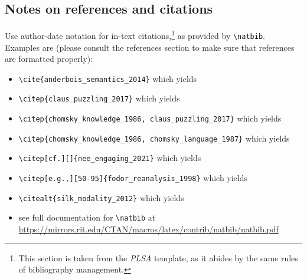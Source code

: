 \documentclass{article}
\begin{document}
\subsection{Notes on references and citations}  \label{ref}
Use author-date notation for in-text citations,\footnote{This section is taken from the \textit{PLSA} template, as it abides by the same rules of bibliography management.} as provided by \verb=\natbib=. Examples are (please consult the references section to make sure that references are formatted properly):
\begin{itemize}
    \item \verb=\cite{anderbois_semantics_2014}= which yields \cite{anderbois_semantics_2014}
    \item \verb=\citep{claus_puzzling_2017}= which yields \citep{claus_puzzling_2017}
    \item \verb=\citep{chomsky_knowledge_1986, claus_puzzling_2017}= which yields \citep{chomsky_knowledge_1986, claus_puzzling_2017}
    \item \verb=\citep{chomsky_knowledge_1986, chomsky_language_1987}= which yields \citep{chomsky_knowledge_1986, chomsky_language_1987}
    \item \verb=\citep[cf.][]{nee_engaging_2021}= which yields \citep[cf.][]{nee_engaging_2021}
    \item \verb=\citep[e.g.,][50-95]{fodor_reanalysis_1998}= which yields \citep[e.g.,][50-95]{fodor_reanalysis_1998}
    \item \verb=\citealt{silk_modality_2012}= which yields \citealt{silk_modality_2012}
    \item see full documentation for \verb=\natbib= at\\ \href{https://mirrors.rit.edu/CTAN/macros/latex/contrib/natbib/natbib.pdf}{https://mirrors.rit.edu/CTAN/macros/latex/contrib/natbib/natbib.pdf}
\end{itemize}
\end{document}
